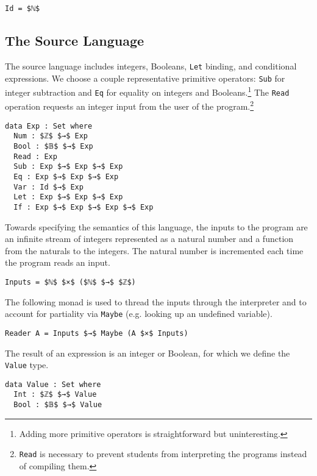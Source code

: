 \documentclass[sigplan,review,dvipsnames,screen,10pt]{acmart}
\begin{document}
\begin{lstlisting}
Id = $ℕ$
\end{lstlisting}

\subsection{The Source Language}

The source language includes integers, Booleans, \texttt{Let} binding,
and conditional expressions. We choose a couple representative
primitive operators: \texttt{Sub} for integer subtraction and
\texttt{Eq} for equality on integers and Booleans.\footnote{Adding
more primitive operators is straightforward but uninteresting.}  The
\texttt{Read} operation requests an integer input from the user of the
program.\footnote{\texttt{Read} is necessary to prevent students from
interpreting the programs instead of compiling them.}

\begin{lstlisting}
data Exp : Set where
  Num : $ℤ$ $→$ Exp
  Bool : $𝔹$ $→$ Exp
  Read : Exp
  Sub : Exp $→$ Exp $→$ Exp
  Eq : Exp $→$ Exp $→$ Exp
  Var : Id $→$ Exp
  Let : Exp $→$ Exp $→$ Exp
  If : Exp $→$ Exp $→$ Exp $→$ Exp
\end{lstlisting}

Towards specifying the semantics of this language, the inputs to the
program are an infinite stream of integers represented as a natural
number and a function from the naturals to the integers.  The natural
number is incremented each time the program reads an input.

\begin{lstlisting}
Inputs = $ℕ$ $×$ ($ℕ$ $→$ $ℤ$)
\end{lstlisting}

The following monad is used to thread the inputs through the
interpreter and to account for partiality via \lstinline{Maybe}
(e.g. looking up an undefined variable).

\begin{lstlisting}
Reader A = Inputs $→$ Maybe (A $×$ Inputs)
\end{lstlisting}

\noindent The result of an expression is an integer or Boolean, for which we
define the \lstinline{Value} type.

\begin{lstlisting}
data Value : Set where
  Int : $ℤ$ $→$ Value
  Bool : $𝔹$ $→$ Value
\end{lstlisting}
\end{document}
